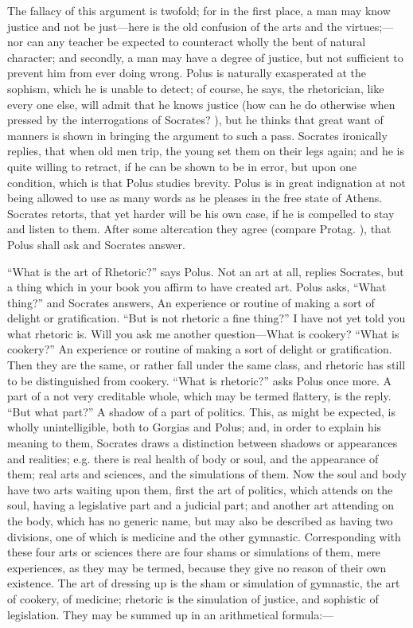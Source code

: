 \documentclass[11pt,letter]{article}
\begin{document}
\par  The fallacy of this argument is twofold; for in the first place, a man may know justice and not be just—here is the old confusion of the arts and the virtues;—nor can any teacher be expected to counteract wholly the bent of natural character; and secondly, a man may have a degree of justice, but not sufficient to prevent him from ever doing wrong. Polus is naturally exasperated at the sophism, which he is unable to detect; of course, he says, the rhetorician, like every one else, will admit that he knows justice (how can he do otherwise when pressed by the interrogations of Socrates? ), but he thinks that great want of manners is shown in bringing the argument to such a pass. Socrates ironically replies, that when old men trip, the young set them on their legs again; and he is quite willing to retract, if he can be shown to be in error, but upon one condition, which is that Polus studies brevity. Polus is in great indignation at not being allowed to use as many words as he pleases in the free state of Athens. Socrates retorts, that yet harder will be his own case, if he is compelled to stay and listen to them. After some altercation they agree (compare Protag. ), that Polus shall ask and Socrates answer.

\par  “What is the art of Rhetoric?” says Polus. Not an art at all, replies Socrates, but a thing which in your book you affirm to have created art. Polus asks, “What thing?” and Socrates answers, An experience or routine of making a sort of delight or gratification. “But is not rhetoric a fine thing?” I have not yet told you what rhetoric is. Will you ask me another question—What is cookery? “What is cookery?” An experience or routine of making a sort of delight or gratification. Then they are the same, or rather fall under the same class, and rhetoric has still to be distinguished from cookery. “What is rhetoric?” asks Polus once more. A part of a not very creditable whole, which may be termed flattery, is the reply. “But what part?” A shadow of a part of politics. This, as might be expected, is wholly unintelligible, both to Gorgias and Polus; and, in order to explain his meaning to them, Socrates draws a distinction between shadows or appearances and realities; e.g. there is real health of body or soul, and the appearance of them; real arts and sciences, and the simulations of them. Now the soul and body have two arts waiting upon them, first the art of politics, which attends on the soul, having a legislative part and a judicial part; and another art attending on the body, which has no generic name, but may also be described as having two divisions, one of which is medicine and the other gymnastic. Corresponding with these four arts or sciences there are four shams or simulations of them, mere experiences, as they may be termed, because they give no reason of their own existence. The art of dressing up is the sham or simulation of gymnastic, the art of cookery, of medicine; rhetoric is the simulation of justice, and sophistic of legislation. They may be summed up in an arithmetical formula:—
\end{document}
